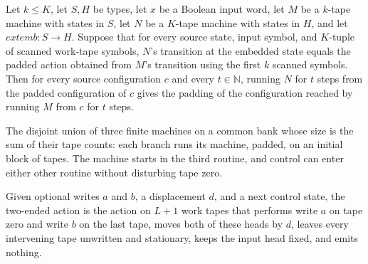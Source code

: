 \begin{lemma}
\label{Complexity.enumCont_pad_run}
\leanok
{}
Let $k\le K$, let $S,H$ be types, let $x$ be a Boolean input word, let $M$ be a $k$-tape
machine with states in $S$, let $N$ be a $K$-tape machine with states in $H$, and let
$	ext{emb}:S\to H$. Suppose that for every source state, input symbol, and $K$-tuple of
scanned work-tape symbols, $N$'s transition at the embedded state equals the padded
action obtained from $M$'s transition using the first $k$ scanned symbols. Then for
every source configuration $c$ and every $t\in\mathbb{N}$, running $N$ for $t$ steps
from the padded configuration of $c$ gives the padding of the configuration reached by
running $M$ from $c$ for $t$ steps.
\end{lemma}

\begin{definition}
\label{Complexity.enumCont_sources}
\leanok
{}
The disjoint union of three finite machines on a common bank whose size is the
sum of their tape counts: each branch runs its machine, padded, on an initial
block of tapes. The machine starts in the third routine, and control can enter
either other routine without disturbing tape zero.
\end{definition}

\begin{definition}
\label{Complexity.enumCont_endsAction}
\leanok
{}
Given optional writes $a$ and $b$, a displacement $d$, and a next control state,
the two-ended action is the action on $L + 1$ work tapes that performs write $a$ on
tape zero and write $b$ on the last tape, moves both of these heads by $d$, leaves
every intervening tape unwritten and stationary, keeps the input head fixed, and
emits nothing.
\end{definition}

